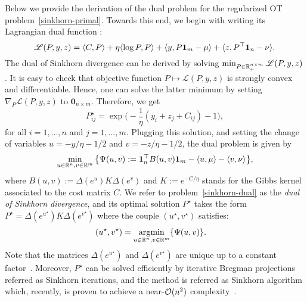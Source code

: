 Below we provide the derivation of the dual problem for the regularized OT problem~\eqref{sinkhorn-primal}. Towards this end, we begin with writing its Lagrangian dual function :
\begin{equation*}
  \mathscr{L}(P,y, z) = \langle C,P \rangle + \eta \langle \log P, P \rangle + \langle y, P\mathbf{1}_m - \mu \rangle + \langle z,P^\top \mathbf{1}_n - \nu \rangle.
\end{equation*}
The dual of Sinkhorn divergence can be derived by solving $\min_{P \in {\mathbb{R}}_+^{n\times m}}\mathscr{L}(P,y, z)$. It is easy to check that objective function $P\mapsto \mathscr{L}(P,y, z)$ is strongly convex and differentiable. Hence, one can solve the latter minimum by setting $\nabla_P \mathscr{L}(P,y, z)$ to $\mathbf{0}_{n\times m}$. Therefore, we get 
\begin{equation*}
  P^\star_{ij} = \exp\Big(- \frac{1}{\eta} (y_i + z_j + C_{ij}) - 1\Big), 
\end{equation*}
for all $i=1, \ldots, n$ and $j=1, \ldots, m$. Plugging this solution,  and setting the change of variables $u = -y/\eta - 1/2$ and $v = - z/\eta - 1/2$, the dual problem is given by
\begin{equation}
\label{sinkhorn-dual}
\min_{u \in {\mathbb{R}}^n, v\in{\mathbb{R}}^m}\big\{\Psi(u,v):= \mathbf{1}_n^\top B(u,v)\mathbf{1}_m - \langle u, \mu \rangle - \langle v, \nu \rangle \big\},
\end{equation}
where $B(u,v) := \Delta(e^{u}) K \Delta(e^{v})$ and $K := e^{-C/\eta}$ stands for the Gibbs kernel associated to the cost matrix $C$. 
We refer to problem~\eqref{sinkhorn-dual} as the \emph{dual of Sinkhorn divergence}, and its optimal solution $P^\star$ takes the form $P^\star = \Delta(e^{u^\star}) K \Delta(e^{v^\star})$
where the couple $(u^\star, v^\star)$ satisfies:
\begin{align*}
\label{sinkhorn-dual}
  (u^\star, v^\star) &= \operatorname*{\arg\!\min}_{u \in {\mathbb{R}}^{n}, v\in {\mathbb{R}}^m} \{\Psi(u,v)\}.
\end{align*}
Note that the matrices $\Delta(e^{u^\star})$ and $\Delta(e^{v^\star})$ are unique up to a constant factor~\citep{sinkhorn1967}. Moreover, $P^\star$ can be solved efficiently by iterative Bregman projections~\citep{benamou2015IterativeBP} referred as Sinkhorn iterations, and the method is referred as Sinkhorn algorithm which, recently, is proven to achieve a near-$\mathcal{O}(n^2)$ complexity~\citep{altschulernips17}.

